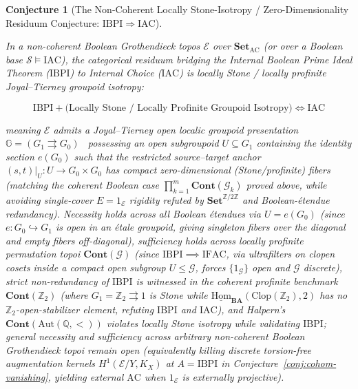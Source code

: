 \documentclass[10pt,twoside,openright]{book}
\theoremstyle{crmplain}
\newtheorem{conjecture}[theorem]{Conjecture}
\theoremstyle{crmdef}
\theoremstyle{crmremark}
\begin{document}
\begin{conjecture}[The Non-Coherent Locally Stone-Isotropy / Zero-Dimensionality Residuum Conjecture: $\mathrm{IBPI} \Rightarrow \mathrm{IAC}$]\label{conj:bpi-ac}

In a non-coherent Boolean Grothendieck topos $\mathcal{E}$ over $\mathbf{Set}_{\mathrm{AC}}$ (or over a Boolean base $\mathcal{S} \models \mathrm{IAC}$), the categorical residuum bridging the Internal Boolean Prime Ideal Theorem ($\mathrm{IBPI}$) to Internal Choice ($\mathrm{IAC}$) is \emph{locally Stone / locally profinite Joyal--Tierney groupoid isotropy}:

\[
  \mathrm{IBPI} + \bigl(\text{Locally Stone / Locally Profinite Groupoid Isotropy}\bigr) \iff \mathrm{IAC}
\]

meaning $\mathcal{E}$ admits a Joyal--Tierney open localic groupoid presentation $\mathbb{G} = (G_1 \rightrightarrows G_0)$~\cite[\S C5.3]{Johnstone02} possessing an open subgroupoid $U \subseteq G_1$ containing the identity section $e(G_0)$ such that the restricted source--target anchor $(s, t)|_U : U \to G_0 \times G_0$ has compact zero-dimensional (Stone/profinite) fibers (matching the coherent Boolean case $\prod_{k=1}^m \mathbf{Cont}(\mathcal{G}_k)$ proved above, while avoiding single-cover $E = 1_{\mathcal{E}}$ rigidity refuted by $\mathbf{Set}^{\mathbb{Z}/2\mathbb{Z}}$ and Boolean-\'etendue redundancy). Necessity holds across all Boolean \'etendues via $U = e(G_0)$ (since $e : G_0 \hookrightarrow G_1$ is open in an \'etale groupoid, giving singleton fibers over the diagonal and empty fibers off-diagonal), sufficiency holds across locally profinite permutation topoi $\mathbf{Cont}(\mathcal{G})$ (since $\mathrm{IBPI} \implies \mathrm{IFAC}$, via ultrafilters on clopen cosets inside a compact open subgroup $U \le \mathcal{G}$, forces $\{1_{\mathcal{G}}\}$ open and $\mathcal{G}$ discrete), strict non-redundancy of $\mathrm{IBPI}$ is witnessed in the coherent profinite benchmark $\mathbf{Cont}(\mathbb{Z}_2)$ (where $G_1 = \mathbb{Z}_2 \rightrightarrows 1$ is Stone while $\underline{\mathrm{Hom}}_{\mathbf{BA}}(\mathrm{Clop}(\mathbb{Z}_2), 2)$ has no $\mathbb{Z}_2$-open-stabilizer element, refuting $\mathrm{IBPI}$ and $\mathrm{IAC}$), and Halpern's $\mathbf{Cont}(\mathrm{Aut}(\mathbb{Q}, <))$ violates locally Stone isotropy while validating $\mathrm{IBPI}$; general necessity and sufficiency across arbitrary non-coherent Boolean Grothendieck topoi remain open (equivalently killing discrete torsion-free augmentation kernels $H^1(\mathcal{E}/Y, K_X)$ at $A = \mathrm{IBPI}$ in Conjecture~\ref{conj:cohom-vanishing}, yielding external $\mathrm{AC}$ when $1_{\mathcal{E}}$ is externally projective).

\end{conjecture}
\end{document}
